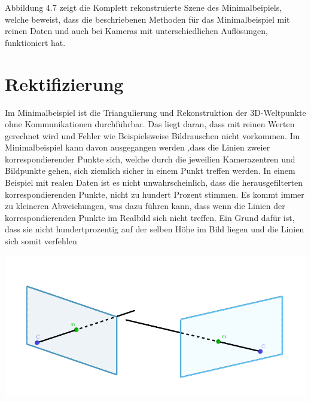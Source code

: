 \pagebreak
Abbildung 4.7 zeigt die Komplett rekonstruierte Szene des Minimalbeipiels, welche beweist, dass die beschriebenen Methoden für das Minimalbeispiel mit reinen Daten und auch bei Kameras mit unterschiedlichen Auflösungen, funktioniert hat. 

\section{Rektifizierung}
\label{sec:rectification}




Im Minimalbeispiel ist die Triangulierung und Rekonstruktion der 3D-Weltpunkte ohne Kommunikationen durchführbar. Das liegt daran, dass mit reinen Werten gerechnet wird und Fehler wie Beispielsweise Bildrauschen nicht vorkommen. Im Minimalbeispiel kann davon ausgegangen werden ,dass die Linien zweier korrespondierender Punkte sich, welche durch die jeweilien Kamerazentren und Bildpunkte gehen, sich ziemlich sicher in einem Punkt treffen werden. In einem Beispiel mit realen Daten ist es nicht unwahrscheinlich, dass die herausgefilterten korrespondierenden Punkte, nicht zu hundert Prozent stimmen. Es kommt immer zu kleineren Abweichungen, was dazu führen kann, dass wenn die Linien der korrespondierenden Punkte im Realbild sich nicht treffen. Ein Grund dafür ist, dass sie nicht hundertprozentig auf der selben Höhe im Bild liegen und die Linien sich somit verfehlen\\



\begin{minipage}{\linewidth}
	\centering
	\includegraphics[width=0.8\linewidth]{images/problemTriangulation.png}
\end{minipage}\\ 




